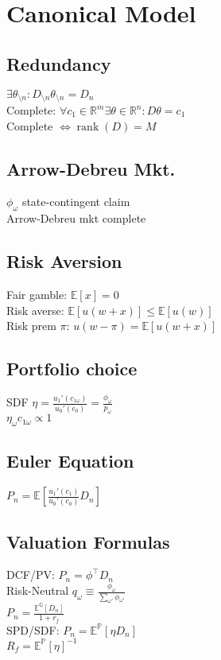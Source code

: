\section{Canonical Model}
	\subsection*{Redundancy}
	$\exists\theta_{\setminus n}: D_{\setminus n}\theta_{\setminus n} = D_{n}$\\
	Complete: $\forall c_{1}\in\mathbb{R}^{m}\exists\theta\in\mathbb{R}^{n}: D\theta = c_{1}$\\
	Complete $\iff\operatorname{rank}\left(D\right) = M$
	
	\subsection*{Arrow-Debreu Mkt.}
	$\phi_{\omega}$ state-contingent claim\\
	Arrow-Debreu mkt complete

	\subsection*{Risk Aversion}
	Fair gamble: $\mathbb{E}\left[x\right] = 0$\\
	Risk averse: $\mathbb{E}\left[u\left(w + x\right)\right]\leq\mathbb{E}\left[u\left(w\right)\right]$\\
	Risk prem $\pi$: $u\left(w - \pi\right) = \mathbb{E}\left[u\left(w + x\right)\right]$
	
	\subsection*{Portfolio choice}
	SDF $\eta = \frac{u_{1}'\left(c_{1\omega}\right)}{u_{0}'\left(c_{0}\right)} = \frac{\phi_{\omega}}{p_{\omega}}$\\
	$\eta_{\omega}c_{1\omega}\propto 1$
	
	\subsection*{Euler Equation}
	$P_{n} = \mathbb{E}\left[\frac{u_{1}'\left(c_{1}\right)}{u_{0}'\left(c_{0}\right)}D_{n}\right]$
	
	\subsection*{Valuation Formulas}
	DCF/PV: $P_{n} = \phi^{\intercal}D_{n}$\\
	Risk-Neutral $q_{\omega}\equiv\frac{\phi_{\omega}}{\sum_{\omega'}\phi_{\omega'}}$\\
	$P_{n} = \frac{\mathbb{E}^{\mathbb{Q}}\left[D_{n}\right]}{1 + r_{f}}$\\
	SPD/SDF: $P_{n} = \mathbb{E}^{\mathbb{P}}\left[\eta D_{n}\right]$\\
	$R_{f} = \mathbb{E}^{\mathbb{P}}\left[\eta\right]^{-1}$
	
